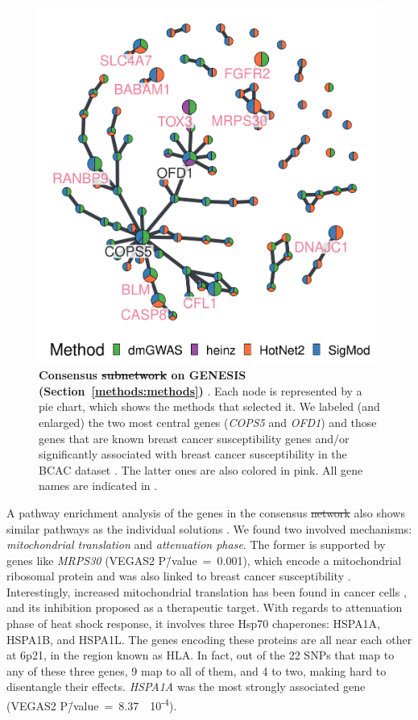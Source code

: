 \documentclass[10pt,letterpaper]{article}
\providecommand{\DIFaddtex}[1]{{\protect\color{blue}\uwave{#1}}} %
\providecommand{\DIFdeltex}[1]{{\protect\color{red}\sout{#1}}}                      %
\providecommand{\DIFaddbegin}{} %
\providecommand{\DIFaddend}{} %
\providecommand{\DIFdelbegin}{} %
\providecommand{\DIFdelend}{} %
\providecommand{\DIFaddFL}[1]{\DIFadd{#1}} %
\providecommand{\DIFdelFL}[1]{\DIFdel{#1}} %
\providecommand{\DIFaddbeginFL}{} %
\providecommand{\DIFaddendFL}{} %
\providecommand{\DIFdelbeginFL}{} %
\providecommand{\DIFdelendFL}{} %
\providecommand{\DIFadd}[1]{\texorpdfstring{\DIFaddtex{#1}}{#1}} %
\providecommand{\DIFdel}[1]{\texorpdfstring{\DIFdeltex{#1}}{}} %
\newcommand{\DIFscaledelfig}{0.5}
\newlength{\DIFdelgraphicswidth} %
\newlength{\DIFdelgraphicsheight} %
\newcommand{\DIFaddincludegraphics}[2][]{{\color{blue}\fbox{\DIFOincludegraphics[#1]{#2}}}} %
\newcommand{\DIFdelincludegraphics}[2][]{%
\sbox{\DIFdelgraphicsbox}{\DIFOincludegraphics[#1]{#2}}%
\settoboxwidth{\DIFdelgraphicswidth}{\DIFdelgraphicsbox} %
\settoboxtotalheight{\DIFdelgraphicsheight}{\DIFdelgraphicsbox} %
\scalebox{\DIFscaledelfig}{%
\parbox[b]{\DIFdelgraphicswidth}{\usebox{\DIFdelgraphicsbox}\\[-\baselineskip] \rule{\DIFdelgraphicswidth}{0em}}\llap{\resizebox{\DIFdelgraphicswidth}{\DIFdelgraphicsheight}{%
\setlength{\unitlength}{\DIFdelgraphicswidth}%
\begin{picture}(1,1)%
\thicklines\linethickness{2pt} %
{\color[rgb]{1,0,0}\put(0,0){\framebox(1,1){}}}%
{\color[rgb]{1,0,0}\put(0,0){\line( 1,1){1}}}%
{\color[rgb]{1,0,0}\put(0,1){\line(1,-1){1}}}%
\end{picture}%
}\hspace*{3pt}}} %
} %
\DeclareRobustCommand{\DIFaddbegin}{\DIFOaddbegin \let\includegraphics\DIFaddincludegraphics} %
\DeclareRobustCommand{\DIFaddend}{\DIFOaddend \let\includegraphics\DIFOincludegraphics} %
\DeclareRobustCommand{\DIFdelbegin}{\DIFOdelbegin \let\includegraphics\DIFdelincludegraphics} %
\DeclareRobustCommand{\DIFdelend}{\DIFOaddend \let\includegraphics\DIFOincludegraphics} %
\DeclareRobustCommand{\DIFaddbeginFL}{\DIFOaddbeginFL \let\includegraphics\DIFaddincludegraphics} %
\DeclareRobustCommand{\DIFaddendFL}{\DIFOaddendFL \let\includegraphics\DIFOincludegraphics} %
\DeclareRobustCommand{\DIFdelbeginFL}{\DIFOdelbeginFL \let\includegraphics\DIFdelincludegraphics} %
\DeclareRobustCommand{\DIFdelendFL}{\DIFOaddendFL \let\includegraphics\DIFOincludegraphics} %
\begin{document}
\begin{figure}[!ht]
  \centering
  \includegraphics[width=.7\linewidth]{./figures/figure_3.pdf}
  \caption{ {\bf Consensus \DIFdelbeginFL \DIFdelFL{subnetwork }\DIFdelendFL \DIFaddbeginFL \DIFaddFL{solution }\DIFaddendFL on GENESIS (Section~\ref{methods:methods}) }. Each node is represented by a pie chart, which shows the methods that selected it. We labeled (and enlarged) the two most central genes (\emph{COPS5} and \emph{OFD1}) and those genes that are known breast cancer susceptibility genes and/or significantly associated with breast cancer susceptibility in the BCAC dataset \DIFaddbeginFL \DIFaddFL{(Section~\ref{methods:bcac})}\DIFaddendFL . The latter ones are also colored in pink. All gene names are indicated in .}
  \label{fig:consensus}
\end{figure}

A pathway enrichment analysis of the genes in the consensus \DIFdelbegin \DIFdel{network }\DIFdelend \DIFaddbegin \DIFadd{solution }\DIFaddend also shows similar pathways as the individual solutions \DIFaddbegin \DIFadd{(}\DIFadd{)}\DIFaddend . We found two involved mechanisms: \emph{mitochondrial translation} and \emph{attenuation phase}. The former is supported by genes like \emph{MRPS30} (VEGAS2 P\=/value~=~0.001), which encode a mitochondrial ribosomal protein and was also linked to breast cancer susceptibility \cite{quigley_5p12_2014}. Interestingly, increased mitochondrial translation has been found in cancer cells \cite{Yu2016Repositioning}, and its inhibition proposed as a therapeutic target. With regards to \DIFaddbegin \DIFadd{the }\DIFaddend attenuation phase of heat shock response, it involves three Hsp70 chaperones: HSPA1A, HSPA1B, and HSPA1L. The genes encoding these proteins are all near each other at 6p21, in the region known as HLA. In fact, out of the 22 SNPs that map to any of these three genes, 9 map to all of them, and 4 to two, making \DIFaddbegin \DIFadd{it }\DIFaddend hard to disentangle their effects. \emph{HSPA1A} was the most strongly associated gene (VEGAS2 P\=/value~=~8.37~\texttimes{}~10\textsuperscript{-4}).  
\end{document}
